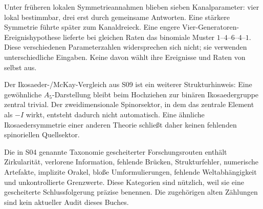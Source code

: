 Unter früheren lokalen Symmetrieannahmen blieben sieben Kanalparameter: vier lokal bestimmbar, drei erst durch gemeinsame Antworten. Eine stärkere Symmetrie führte später zum Kanaldreieck. Eine engere Vier-Generatoren-Ereignishypothese lieferte bei gleichen Raten das binomiale Muster $1$--$4$--$6$--$4$--$1$. Diese verschiedenen Parameterzahlen widersprechen sich nicht; sie verwenden unterschiedliche Eingaben. Keine davon wählt ihre Ereignisse und Raten von selbst aus.

Der Ikosaeder-/McKay-Vergleich aus S09 ist ein weiterer Strukturhinweis: Eine gewöhnliche $A_5$-Darstellung bleibt beim Hochziehen zur binären Ikosaedergruppe zentral trivial. Der zweidimensionale Spinorsektor, in dem das zentrale Element als $-I$ wirkt, entsteht dadurch nicht automatisch. Eine ähnliche Ikosaedersymmetrie einer anderen Theorie schließt daher keinen fehlenden spinoriellen Quellsektor.

Die in S04 genannte Taxonomie gescheiterter Forschungsrouten enthält Zirkularität, verlorene Information, fehlende Brücken, Strukturfehler, numerische Artefakte, implizite Orakel, bloße Umformulierungen, fehlende Weltabhängigkeit und unkontrollierte Grenzwerte. Diese Kategorien sind nützlich, weil sie eine gescheiterte Schlussfolgerung präzise benennen. Die zugehörigen alten Zählungen sind kein aktueller Audit dieses Buches.

